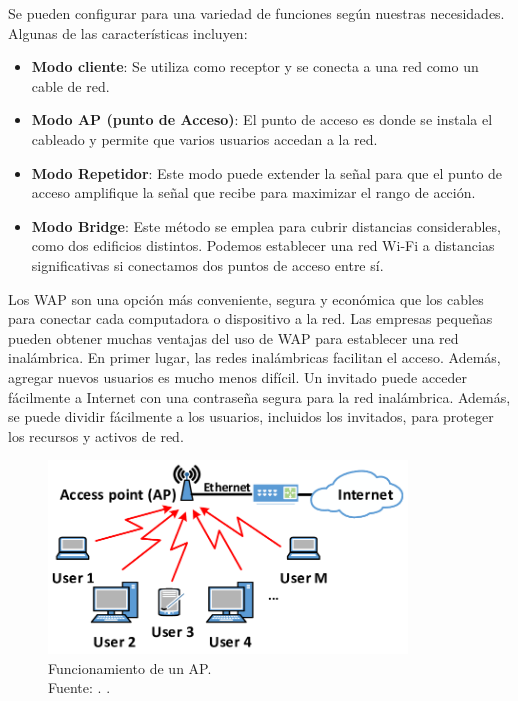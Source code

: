 Se pueden configurar para una variedad de funciones según nuestras necesidades. Algunas de las características incluyen:

\begin{itemize}
	\item \textbf{Modo cliente}: Se utiliza como receptor y se conecta a una red como un cable de red. \parencite{ot_ymant2023ap}
	\item \textbf{Modo AP (punto de Acceso)}: El punto de acceso es donde se instala el cableado y permite que varios usuarios accedan a la red. \parencite{ot_ymant2023ap}
	\item \textbf{Modo Repetidor}: Este modo puede extender la señal para que el punto de acceso amplifique la señal que recibe para maximizar el rango de acción. \parencite{ot_ymant2023ap}
	\item \textbf{Modo Bridge}: Este método se emplea para cubrir distancias considerables, como dos edificios distintos. Podemos establecer una red Wi-Fi a distancias significativas si conectamos dos puntos de acceso entre sí. \parencite{ot_ymant2023ap}
\end{itemize}

Los WAP son una opción más conveniente, segura y económica que los cables para conectar cada computadora o dispositivo a la red. Las empresas pequeñas pueden obtener muchas ventajas del uso de WAP para establecer una red inalámbrica. En primer lugar, las redes inalámbricas facilitan el acceso. Además, agregar nuevos usuarios es mucho menos difícil. Un invitado puede acceder fácilmente a Internet con una contraseña segura para la red inalámbrica. Además, se puede dividir fácilmente a los usuarios, incluidos los invitados, para proteger los recursos y activos de red. \parencite{ot_cisco2024queesap}

\begin{figure}[!ht]
	\begin{center}
		\includegraphics[width=0.85\textwidth]{2/figures/funcionap.png}
		\caption[Funcionamiento de un AP]{Funcionamiento de un AP.\\
			Fuente: \cite{ot_ymant2023ap}. .}
		\label{2:fig53}
	\end{center}
\end{figure}

